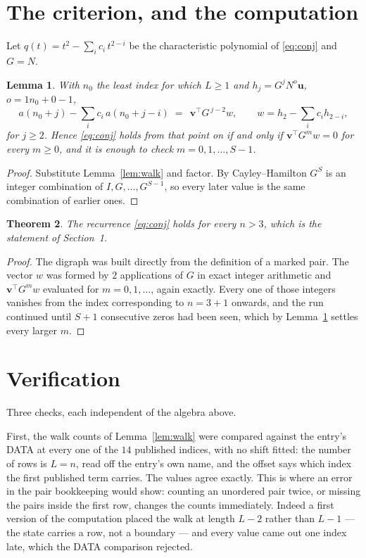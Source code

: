 \documentclass[11pt,a4paper]{article}
\theoremstyle{plain}
\newtheorem{theorem}{Theorem}
\newtheorem{lemma}[theorem]{Lemma}
\theoremstyle{definition}
\begin{document}
\section{The criterion, and the computation}

Let $q(t)=t^{2}-\sum_i c_i\,t^{2-i}$ be the characteristic polynomial of
\eqref{eq:conj} and $G=N$.

\begin{lemma}\label{lem:crit}
With $n_0$ the least index for which $L\ge1$ and $h_j=G^{j}N^{o}\mathbf{u}$,
$o=1n_0+0-1$,
\[
a(n_0+j)-\sum_i c_i\,a(n_0+j-i)\;=\;\,\mathbf{v}^{\!\top}G^{\,j-2}w,
\qquad w=h_{2}-\sum_i c_i h_{2-i},
\]
for $j\ge2$. Hence \eqref{eq:conj} holds from that point on if and only if
$\mathbf{v}^{\!\top}G^{m}w=0$ for every $m\ge0$, and it is enough to check
$m=0,1,\dots,S-1$.
\end{lemma}

\begin{proof}
Substitute Lemma~\ref{lem:walk} and factor. By Cayley--Hamilton $G^{S}$ is an integer
combination of $I,G,\dots,G^{S-1}$, so every later value is the same combination of earlier
ones.
\end{proof}

\begin{theorem}
The recurrence \eqref{eq:conj} holds for every $n>3$, which is the statement of
Section~1.
\end{theorem}

\begin{proof}
The digraph was built directly from the definition of a marked pair. The vector $w$ was
formed by $2$ applications of $G$ in exact integer arithmetic and
$\mathbf{v}^{\!\top}G^{m}w$ evaluated for $m=0,1,\dots$, again exactly. Every one of
those integers vanishes from the index corresponding to $n=3+1$ onwards, and the run
continued until $S+1$ consecutive zeros had been seen, which by Lemma~\ref{lem:crit}
settles every larger $m$.
\end{proof}

\section{Verification}

Three checks, each independent of the algebra above.

First, the walk counts of Lemma~\ref{lem:walk} were compared against the entry's DATA at
every one of the $14$ published indices, with no shift fitted: the number of rows is
$L=n$, read off the entry's own name, and the offset says which index the first
published term carries. The values agree exactly. This is where an error in the pair
bookkeeping would show: counting an unordered pair twice, or missing the pairs inside the
first row, changes the counts immediately. Indeed a first version of the computation
placed the walk at length $L-2$ rather than $L-1$ --- the state carries a row, not a
boundary --- and every value came out one index late, which the DATA comparison rejected.
\end{document}
